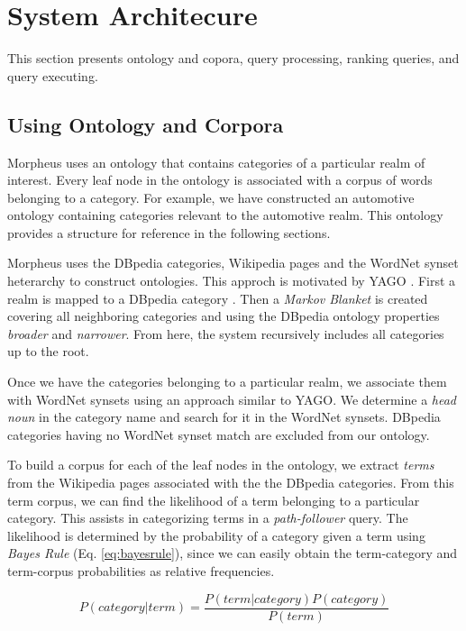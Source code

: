 \section{System Architecure}
\label{sec:systemarch}

This section presents ontology and copora, query processing, ranking queries, and query executing.

\subsection{Using Ontology and Corpora} 
\label{sec:ontology_corpora}

Morpheus uses an ontology that contains categories of a particular realm of interest. Every leaf node in the ontology is associated with a corpus of words belonging to a category.  For example, we have constructed an automotive ontology containing categories relevant to the automotive realm. This ontology provides a structure for reference in the following sections.

Morpheus uses the DBpedia categories, Wikipedia pages and the WordNet synset heterarchy to construct ontologies. This approch is motivated by YAGO \cite{Suchanek2009phd}. First a realm is mapped to a DBpedia category \cite{Bizer2009}. 
Then a \emph{Markov Blanket} \cite{PRIS} is created covering all neighboring categories and using the DBpedia ontology properties \emph{broader} and \emph{narrower}. From here, the system recursively includes all categories up to the root.  

Once we have the categories belonging to a particular realm, we associate them with WordNet synsets using an approach similar to YAGO\cite{Suchanek2009phd}. We determine a \emph{head noun} in the category name and search for it in the WordNet synsets. DBpedia categories having no WordNet synset match are excluded from our ontology. 

To build a corpus for each of the leaf nodes in the ontology, 
we extract \emph{terms} from the Wikipedia pages associated with the 
the DBpedia categories. From this term corpus, 
we can find the likelihood of a term belonging to a particular category. This assists in categorizing terms in a \emph{path-follower} query.
The likelihood is determined by the probability of a category given a term 
using \textit{Bayes Rule} (Eq. \ref{eq:bayesrule}), since we can 
easily obtain the term-category and term-corpus probabilities as 
relative frequencies. 

\begin{equation}
\label{eq:bayesrule}
P (category | term) = \frac{P(term | category) P(category)}{P(term)}
\end{equation}    

